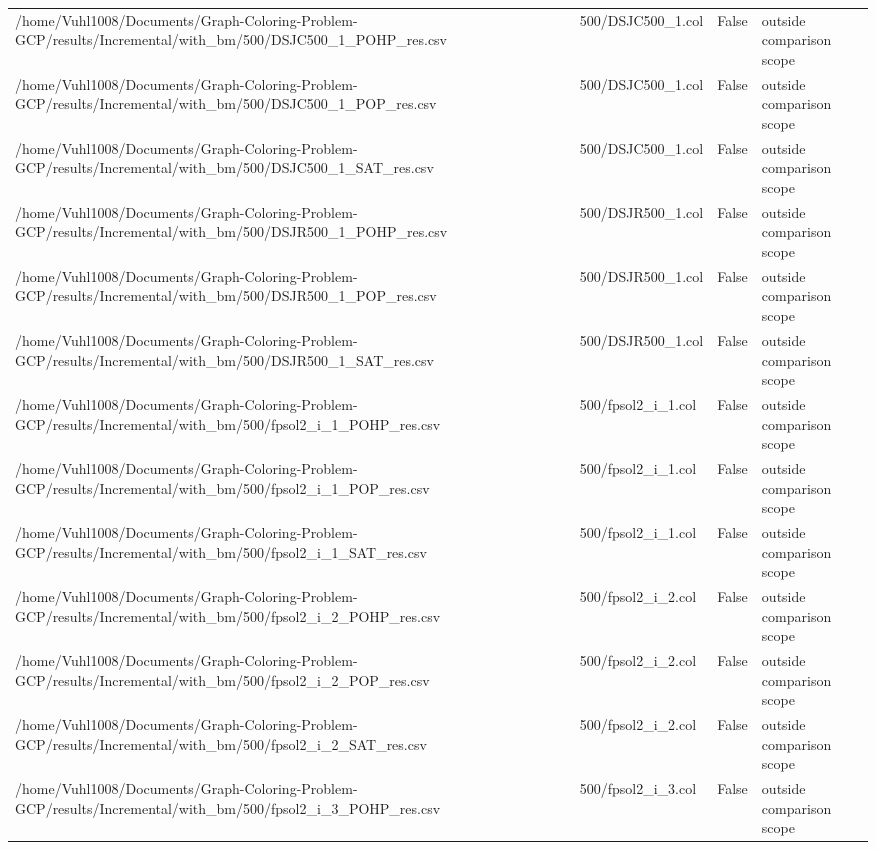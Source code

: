\begin{table}[htbp]
\begin{tabular}{llll}
/home/Vuhl1008/Documents/Graph-Coloring-Problem-GCP/results/Incremental/with\_bm/500/DSJC500\_1\_POHP\_res.csv & 500/DSJC500\_1.col & False & outside comparison scope \\
/home/Vuhl1008/Documents/Graph-Coloring-Problem-GCP/results/Incremental/with\_bm/500/DSJC500\_1\_POP\_res.csv & 500/DSJC500\_1.col & False & outside comparison scope \\
/home/Vuhl1008/Documents/Graph-Coloring-Problem-GCP/results/Incremental/with\_bm/500/DSJC500\_1\_SAT\_res.csv & 500/DSJC500\_1.col & False & outside comparison scope \\
/home/Vuhl1008/Documents/Graph-Coloring-Problem-GCP/results/Incremental/with\_bm/500/DSJR500\_1\_POHP\_res.csv & 500/DSJR500\_1.col & False & outside comparison scope \\
/home/Vuhl1008/Documents/Graph-Coloring-Problem-GCP/results/Incremental/with\_bm/500/DSJR500\_1\_POP\_res.csv & 500/DSJR500\_1.col & False & outside comparison scope \\
/home/Vuhl1008/Documents/Graph-Coloring-Problem-GCP/results/Incremental/with\_bm/500/DSJR500\_1\_SAT\_res.csv & 500/DSJR500\_1.col & False & outside comparison scope \\
/home/Vuhl1008/Documents/Graph-Coloring-Problem-GCP/results/Incremental/with\_bm/500/fpsol2\_i\_1\_POHP\_res.csv & 500/fpsol2\_i\_1.col & False & outside comparison scope \\
/home/Vuhl1008/Documents/Graph-Coloring-Problem-GCP/results/Incremental/with\_bm/500/fpsol2\_i\_1\_POP\_res.csv & 500/fpsol2\_i\_1.col & False & outside comparison scope \\
/home/Vuhl1008/Documents/Graph-Coloring-Problem-GCP/results/Incremental/with\_bm/500/fpsol2\_i\_1\_SAT\_res.csv & 500/fpsol2\_i\_1.col & False & outside comparison scope \\
/home/Vuhl1008/Documents/Graph-Coloring-Problem-GCP/results/Incremental/with\_bm/500/fpsol2\_i\_2\_POHP\_res.csv & 500/fpsol2\_i\_2.col & False & outside comparison scope \\
/home/Vuhl1008/Documents/Graph-Coloring-Problem-GCP/results/Incremental/with\_bm/500/fpsol2\_i\_2\_POP\_res.csv & 500/fpsol2\_i\_2.col & False & outside comparison scope \\
/home/Vuhl1008/Documents/Graph-Coloring-Problem-GCP/results/Incremental/with\_bm/500/fpsol2\_i\_2\_SAT\_res.csv & 500/fpsol2\_i\_2.col & False & outside comparison scope \\
/home/Vuhl1008/Documents/Graph-Coloring-Problem-GCP/results/Incremental/with\_bm/500/fpsol2\_i\_3\_POHP\_res.csv & 500/fpsol2\_i\_3.col & False & outside comparison scope \\

\end{tabular}
\end{table}
